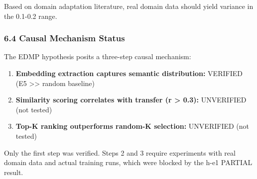 Based on domain adaptation literature, real domain data should yield variance in the 0.1-0.2 range.

\subsubsection{6.4 Causal Mechanism Status}

The EDMP hypothesis posits a three-step causal mechanism:

\begin{enumerate}
\item \textbf{Embedding extraction captures semantic distribution:} VERIFIED (E5 >> random baseline)
\item \textbf{Similarity scoring correlates with transfer (r > 0.3):} UNVERIFIED (not tested)
\item \textbf{Top-K ranking outperforms random-K selection:} UNVERIFIED (not tested)
\end{enumerate}

Only the first step was verified. Steps 2 and 3 require experiments with real domain data and actual training runs, which were blocked by the h-e1 PARTIAL result.

